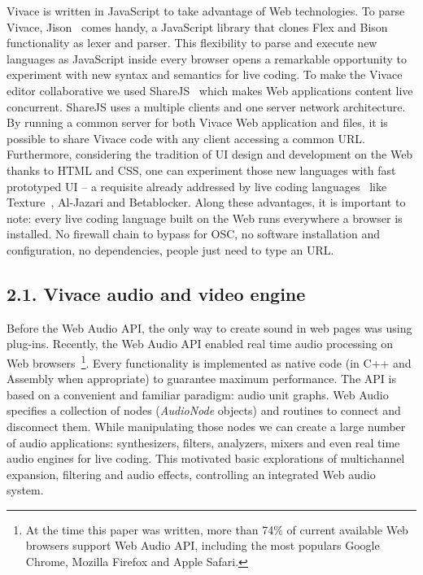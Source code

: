\documentclass[12pt,times,twocolumn]{article}
\begin{document}
Vivace is written in JavaScript to take advantage of Web technologies.
To parse Vivace, Jison~\cite{jison} comes handy, a JavaScript
library that clones Flex and Bison functionality as lexer and
parser. This flexibility to parse and execute new languages as
JavaScript inside every browser opens a remarkable opportunity to
experiment with new syntax and semantics for live coding. To make the
Vivace editor collaborative we used ShareJS~\cite{sharejs} which makes
Web applications content live concurrent. ShareJS uses a multiple clients and
one server network architecture. By running a common server for both
Vivace Web application and files, it is possible
to share Vivace code with any client accessing a common
URL. Furthermore, considering the tradition of UI design and
development on the Web thanks to HTML and CSS, one can experiment
those new languages with fast prototyped UI -- a requisite already
addressed by live coding languages~\cite{mclean2010visualisation,
  magnusson2011algorithms} like Texture~\cite{mclean2011texture},
Al-Jazari and Betablocker. Along these advantages, it is important to
note: every live coding language built on the Web runs everywhere a
browser is installed. No firewall chain to bypass for OSC, no software
installation and configuration, no dependencies, people just need to
type an URL.

\subsection{2.1. Vivace audio and video engine}
Before the Web Audio API, the only way to create sound in web pages
was using plug-ins. Recently, the Web Audio API enabled real time
audio processing on Web browsers~\footnote{At the time this paper was
  written, more than 74\% of current available Web browsers support Web Audio
  API\cite{caniuse}, including the most populars Google Chrome, Mozilla Firefox and Apple
  Safari.}. Every functionality is implemented as native code (in C++
and Assembly when appropriate) to guarantee maximum performance. The
API is based on a convenient and familiar paradigm: audio unit
graphs. Web Audio specifies a collection of nodes (\emph{AudioNode}
objects) and routines to connect and disconnect them. While
manipulating those nodes we can create a large number of audio
applications: synthesizers, filters, analyzers, mixers and even real
time audio engines for live coding. This motivated basic explorations
of multichannel expansion, filtering and audio effects, controlling an
integrated Web audio system.
\end{document}
